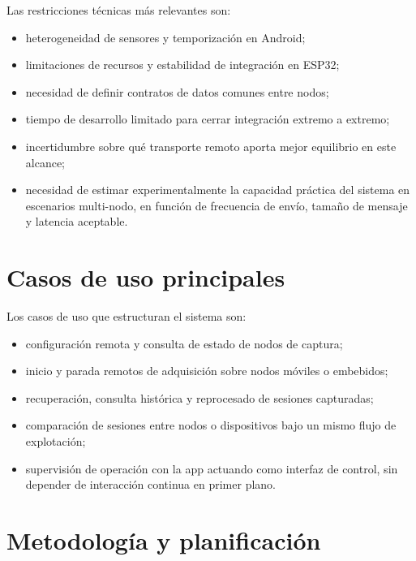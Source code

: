 Las restricciones técnicas más relevantes son:

\begin{itemize}
  \item heterogeneidad de sensores y temporización en Android;
  \item limitaciones de recursos y estabilidad de integración en ESP32;
  \item necesidad de definir contratos de datos comunes entre nodos;
  \item tiempo de desarrollo limitado para cerrar integración extremo a extremo;
  \item incertidumbre sobre qué transporte remoto aporta mejor equilibrio en este alcance;
  \item necesidad de estimar experimentalmente la capacidad práctica del sistema en escenarios multi-nodo, en función de frecuencia de envío, tamaño de mensaje y latencia aceptable.
\end{itemize}

\section{Casos de uso principales}

Los casos de uso que estructuran el sistema son:

\begin{itemize}
  \item configuración remota y consulta de estado de nodos de captura;
  \item inicio y parada remotos de adquisición sobre nodos móviles o embebidos;
  \item recuperación, consulta histórica y reprocesado de sesiones capturadas;
  \item comparación de sesiones entre nodos o dispositivos bajo un mismo flujo de explotación;
  \item supervisión de operación con la app actuando como interfaz de control, sin depender de interacción continua en primer plano.
\end{itemize}

\label{fig:placeholder-casos-uso}

\section{Metodología y planificación}

